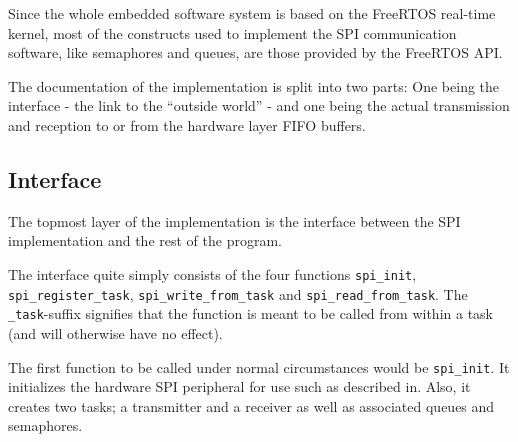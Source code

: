Since the whole embedded software system is based on the FreeRTOS real-time kernel, most of the constructs used to implement the SPI communication software, like semaphores and queues, are those provided by the FreeRTOS API.

The documentation of the implementation is split into two parts: One being the interface - the link to the ``outside world'' - and one being the actual transmission and reception to or from the hardware layer FIFO buffers.



\subsection{Interface}
The topmost layer of the implementation is the interface between the SPI implementation and the rest of the program.

The interface quite simply consists of the four functions \texttt{spi\_init}, \texttt{spi\_register\_task}, \texttt{spi\_write\_from\_task} and \texttt{spi\_read\_from\_task}. The \texttt{\_task}-suffix signifies that the function is meant to be called from within a task (and will otherwise have no effect).

The first function to be called under normal circumstances would be \texttt{spi\_init}. It initializes the hardware SPI peripheral for use such as described in. Also, it creates two tasks; a transmitter and a receiver as well as associated queues and semaphores.

